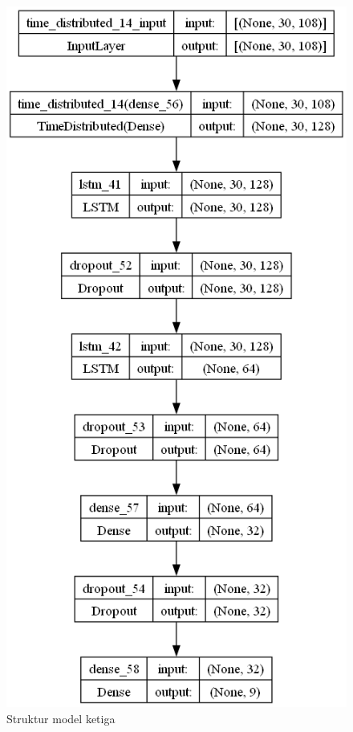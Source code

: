 \begin{figure}[H]
  \centering

  \includegraphics[scale=0.5]{gambar/bab4-uji-model-best-model.png}

  \caption{Struktur model ketiga}
  \label{fig:model3-struktur}
\end{figure}

